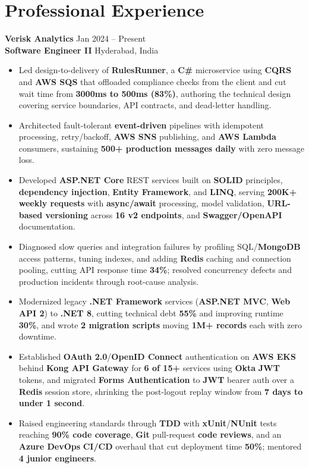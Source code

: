 \documentclass[a4paper,10pt]{article}
\begin{document}
\section*{Professional Experience}

\textbf{Verisk Analytics} \hfill Jan 2024 -- Present \\
\textbf{Software Engineer II} \hfill Hyderabad, India

\begin{itemize}[leftmargin=*]
    \item Led design-to-delivery of \textbf{RulesRunner}, a \textbf{C\#} microservice using \textbf{CQRS} and \textbf{AWS SQS} that offloaded compliance checks from the client and cut wait time from \textbf{3000ms to 500ms (83\%)}, authoring the technical design covering service boundaries, API contracts, and dead-letter handling.
    \item Architected fault-tolerant \textbf{event-driven} pipelines with idempotent processing, retry/backoff, \textbf{AWS SNS} publishing, and \textbf{AWS Lambda} consumers, sustaining \textbf{500+ production messages daily} with zero message loss.
    \item Developed \textbf{ASP.NET Core} REST services built on \textbf{SOLID} principles, \textbf{dependency injection}, \textbf{Entity Framework}, and \textbf{LINQ}, serving \textbf{200K+ weekly requests} with \textbf{async/await} processing, model validation, \textbf{URL-based versioning} across \textbf{16 v2 endpoints}, and \textbf{Swagger/OpenAPI} documentation.
    \item Diagnosed slow queries and integration failures by profiling SQL/\textbf{MongoDB} access patterns, tuning indexes, and adding \textbf{Redis} caching and connection pooling, cutting API response time \textbf{34\%}; resolved concurrency defects and production incidents through root-cause analysis.
    \item Modernized legacy \textbf{.NET Framework} services (\textbf{ASP.NET MVC}, \textbf{Web API 2}) to \textbf{.NET 8}, cutting technical debt \textbf{55\%} and improving runtime \textbf{30\%}, and wrote \textbf{2 migration scripts} moving \textbf{1M+ records} each with zero downtime.
    \item Established \textbf{OAuth 2.0}/\textbf{OpenID Connect} authentication on \textbf{AWS EKS} behind \textbf{Kong API Gateway} for \textbf{6 of 15+} services using \textbf{Okta} \textbf{JWT} tokens, and migrated \textbf{Forms Authentication} to \textbf{JWT} bearer auth over a \textbf{Redis} session store, shrinking the post-logout replay window from \textbf{7 days to under 1 second}.
    \item Raised engineering standards through \textbf{TDD} with \textbf{xUnit}/\textbf{NUnit} tests reaching \textbf{90\% code coverage}, \textbf{Git} pull-request \textbf{code reviews}, and an \textbf{Azure DevOps} \textbf{CI/CD} overhaul that cut deployment time \textbf{50\%}; mentored \textbf{4 junior engineers}.
\end{itemize}
\end{document}

